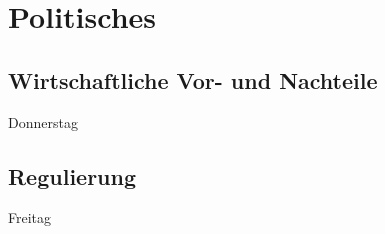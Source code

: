 \section{Politisches}
\subsection{Wirtschaftliche Vor- und Nachteile}
Donnerstag
\subsection{Regulierung}
Freitag


